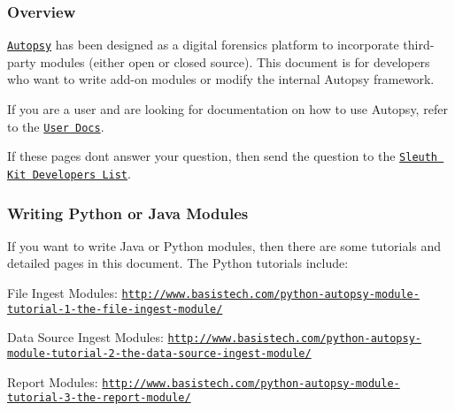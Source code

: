 \subsubsection*{Overview}

\href{http://www.sleuthkit.org/autopsy/}{\tt Autopsy} has been designed as a digital forensics platform to incorporate third-\/party modules (either open or closed source). This document is for developers who want to write add-\/on modules or modify the internal Autopsy framework.

If you are a user and are looking for documentation on how to use Autopsy, refer to the \href{http://sleuthkit.org/autopsy/docs/user-docs/}{\tt User Docs}.

If these pages don\textquotesingle{}t answer your question, then send the question to the \href{https://lists.sourceforge.net/lists/listinfo/sleuthkit-developers}{\tt Sleuth Kit Developer\textquotesingle{}s List}.

\subsubsection*{Writing Python or Java Modules}

If you want to write Java or Python modules, then there are some tutorials and detailed pages in this document. The Python tutorials include\+:
\begin{DoxyItemize}
\item File Ingest Modules\+: \href{http://www.basistech.com/python-autopsy-module-tutorial-1-the-file-ingest-module/}{\tt http\+://www.\+basistech.\+com/python-\/autopsy-\/module-\/tutorial-\/1-\/the-\/file-\/ingest-\/module/}
\item Data Source Ingest Modules\+: \href{http://www.basistech.com/python-autopsy-module-tutorial-2-the-data-source-ingest-module/}{\tt http\+://www.\+basistech.\+com/python-\/autopsy-\/module-\/tutorial-\/2-\/the-\/data-\/source-\/ingest-\/module/}
\item Report Modules\+: \href{http://www.basistech.com/python-autopsy-module-tutorial-3-the-report-module/}{\tt http\+://www.\+basistech.\+com/python-\/autopsy-\/module-\/tutorial-\/3-\/the-\/report-\/module/}
\end{DoxyItemize}

